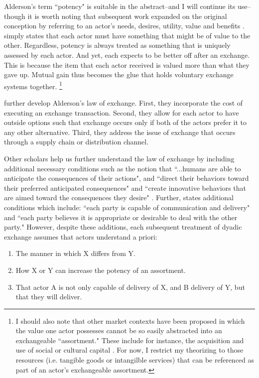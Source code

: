 Alderson's term ``potency" is suitable in the abstract--and I will continue its use--though it is worth noting that subsequent work expanded on the original conception by referring to an actor's needs, desires, utility, value and benefits \citep{bagozzi1975, houston1987, kotler1984}. \citet{kotler1984} simply states that each actor must have something that might be of value to the other. Regardless, potency is always treated as something that is uniquely assessed by each actor. And yet, each expects to be better off after an exchange. This is because the item that each actor received is valued more than what they gave up. Mutual gain thus becomes the glue that holds voluntary exchange systems together. \footnote{I should also note that other market contexts have been proposed in which the value one actor possesses cannot be so easily abstracted into an exchangeable ``assortment." These include for instance, the acquisition and use of social or cultural capital \citep{bourdieu1984, veblen1899}. For now, I restrict my theorizing to those resources (i.e. tangible goods or intangilble services) that can be referenced as part of an actor's exchangeable assortment.}

\citet{alderson1965b} further develop Alderson's law of exchange. First, they incorporate the cost of executing an exchange transaction. Second, they allow for each actor to have outside options such that exchange occurs only if both of the actors prefer it to any other alternative. Third, they address the issue of exchange that occurs through a supply chain or distribution channel. 

Other scholars help us further understand the law of exchange by including additional necessary conditions such as the notion that ``...humans are able to anticipate the consequences of their actions", and ``direct their behaviors toward their preferred anticipated consequences" and ``create innovative behaviors that are aimed toward the consequences they desire" \citep[pp. 29-30]{blalock1979}.  Further, \citet {kotler1984} states additional conditions which include: ``each party is capable of communication and delivery" and ``each party believes it is appropriate or desirable to deal with the other party." However, despite these additions, each subsequent treatment of dyadic exchange assumes that actors understand a priori: 

\begin{enumerate}
  \item The manner in which X differs from Y.
  \item How X or Y can increase the potency of an assortment.
  \item That actor A is not only capable of delivery of X, and B delivery of Y, but that they will deliver. 
\end{enumerate}

